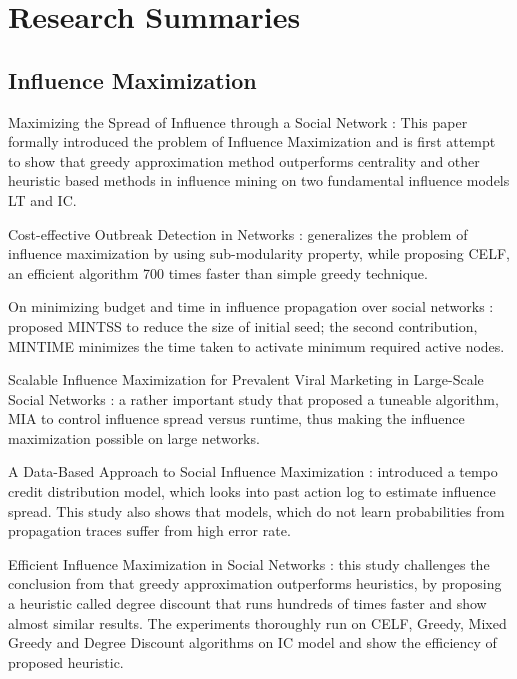 
\chapter{Research Summaries}

\section*{Influence Maximization}

Maximizing the Spread of Influence through a Social Network \cite{kempe2003}:
This paper formally introduced the problem of Influence Maximization and is first attempt to show that greedy approximation method outperforms centrality and other heuristic based methods in influence mining on two fundamental influence models LT and IC.
	
Cost-effective Outbreak Detection in Networks \cite{leskovec2007b}: generalizes the problem of influence maximization by using sub-modularity property, while proposing CELF, an efficient algorithm 700 times faster than simple greedy technique.
	
On minimizing budget and time in influence propagation over social networks \cite{goyal2012}: proposed MINTSS to reduce the size of initial seed; the second contribution, MINTIME minimizes the time taken to activate minimum required active nodes.
	
Scalable Influence Maximization for Prevalent Viral Marketing in Large-Scale Social Networks \cite{chen2010b}: a rather important study that proposed a tuneable algorithm, MIA to control influence spread versus runtime, thus making the influence maximization possible on large networks.
	
A Data-Based Approach to Social Influence Maximization \cite{goyal2011}: introduced a tempo credit distribution model, which looks into past action log to estimate influence spread. This study also shows that models, which do not learn probabilities from propagation traces suffer from high error rate.
	
Efficient Influence Maximization in Social Networks \cite{chen2009}: this study challenges the conclusion from \cite{kempe2003} that greedy approximation outperforms heuristics, by proposing a heuristic called degree discount that runs hundreds of times faster and show almost similar results. The experiments thoroughly run on CELF, Greedy, Mixed Greedy and Degree Discount algorithms on IC model and show the efficiency of proposed heuristic.
	
